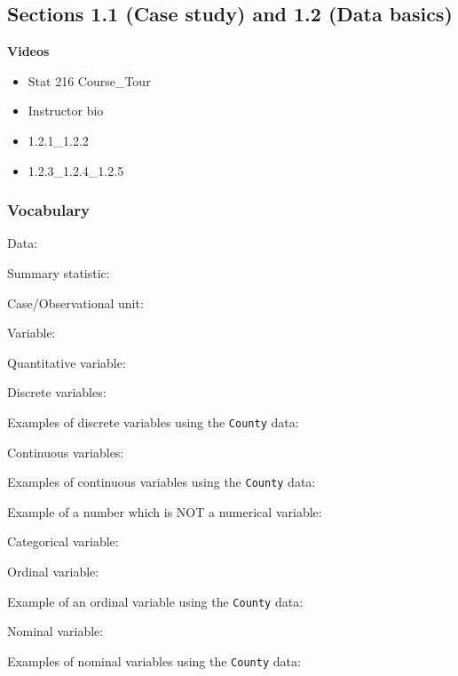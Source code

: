 \documentclass[
]{report}
\providecommand{\tightlist}{%
  \setlength{\itemsep}{0pt}\setlength{\parskip}{0pt}}
\newcommand{\rgs}{\vspace{12pt}} %
\newcommand{\rgi}{\hspace{24pt}}  %
\begin{document}
\hypertarget{sections-1.1-case-study-and-1.2-data-basics}{%
\subsection*{Sections 1.1 (Case study) and 1.2 (Data basics)}\label{sections-1.1-case-study-and-1.2-data-basics}}

\textbf{Videos}

\begin{itemize}
\tightlist
\item
  Stat 216 Course\_Tour
\item
  Instructor bio
\item
  1.2.1\_1.2.2
\item
  1.2.3\_1.2.4\_1.2.5
\end{itemize}


\hypertarget{vocabulary}{%
\subsubsection*{Vocabulary}\label{vocabulary}}

Data:
\rgs

Summary statistic:
\rgs

Case/Observational unit:
\rgs

Variable:
\rgs

\rgi Quantitative variable:
\rgs

\rgi Discrete variables:
\rgs

\rgi \rgi Examples of discrete variables using the \texttt{County} data:
\rgs

\rgi Continuous variables:
\rgs

\rgi \rgi Examples of continuous variables using the \texttt{County} data:
\rgs

Example of a number which is NOT a numerical variable:
\rgs

Categorical variable:
\rgs

\rgi Ordinal variable:
\rgs

\rgi \rgi Example of an ordinal variable using the \texttt{County} data:
\rgs

\rgi Nominal variable:
\rgs

\rgi \rgi Examples of nominal variables using the \texttt{County} data:

\rgs
\end{document}

